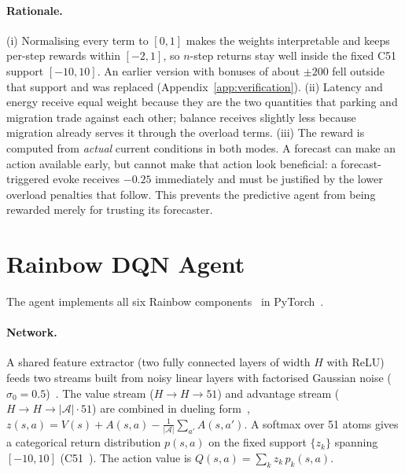 \paragraph{Rationale.} (i) Normalising every term to $[0,1]$ makes the weights interpretable and keeps per-step rewards within $[-2,1]$, so $n$-step returns stay well inside the fixed C51 support $[-10,10]$. An earlier version with bonuses of about $\pm200$ fell outside that support and was replaced (Appendix~\ref{app:verification}). (ii) Latency and energy receive equal weight because they are the two quantities that parking and migration trade against each other; balance receives slightly less because migration already serves it through the overload terms. (iii) The reward is computed from \emph{actual} current conditions in both modes. A forecast can make an action available early, but cannot make that action look beneficial: a forecast-triggered evoke receives $-0.25$ immediately and must be justified by the lower overload penalties that follow. This prevents the predictive agent from being rewarded merely for trusting its forecaster.

\section{Rainbow DQN Agent}
\label{sec:rainbow}

The agent implements all six Rainbow components~\cite{hessel2018rainbow} in PyTorch~\cite{paszke2019pytorch}.

\paragraph{Network.} A shared feature extractor (two fully connected layers of width $H$ with ReLU) feeds two streams built from noisy linear layers with factorised Gaussian noise ($\sigma_0=0.5$)~\cite{fortunato2018noisy}. The value stream ($H\to H\to51$) and advantage stream ($H\to H\to|\mathcal{A}|\cdot51$) are combined in dueling form~\cite{wang2016dueling},
$z(s,a)=V(s)+A(s,a)-\frac{1}{|\mathcal{A}|}\sum_{a'}A(s,a')$. A softmax over 51 atoms gives a categorical return distribution $p(s,a)$ on the fixed support $\{z_k\}$ spanning $[-10,10]$ (C51~\cite{bellemare2017c51}). The action value is $Q(s,a)=\sum_k z_k\,p_k(s,a)$.

